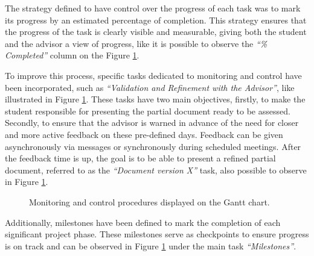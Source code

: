 The strategy defined to have control over the progress of each task was to mark its progress by an estimated percentage of completion. This strategy ensures that the progress of the task is clearly visible and measurable, giving both the student and the advisor a view of progress, like it is possible to observe the \textit{“\% Completed”} column on the Figure \ref{fig:gantt_monitoring}.

To improve this process, specific tasks dedicated to monitoring and control have been incorporated, such as \textit{“Validation and Refinement with the Advisor”}, like illustrated in Figure \ref{fig:gantt_monitoring}. These tasks have two main objectives, firstly, to make the student responsible for presenting the partial document ready to be assessed. Secondly, to ensure that the advisor is warned in advance of the need for closer and more active feedback on these pre-defined days. Feedback can be given asynchronously via messages or synchronously during scheduled meetings. After the feedback time is up, the goal is to be able to present a refined partial document, referred to as the \textit{“Document version X”} task, also possible to observe in Figure \ref{fig:gantt_monitoring}.

\begin{figure}
      \centering
      \caption{Monitoring and control procedures displayed on the Gantt chart.}
      \label{fig:gantt_monitoring}
\end{figure}

Additionally, milestones have been defined to mark the completion of each significant project phase. These milestones serve as checkpoints to ensure progress is on track and can be observed in Figure \ref{fig:gantt_monitoring} under the main task \textit{“Milestones”}.

